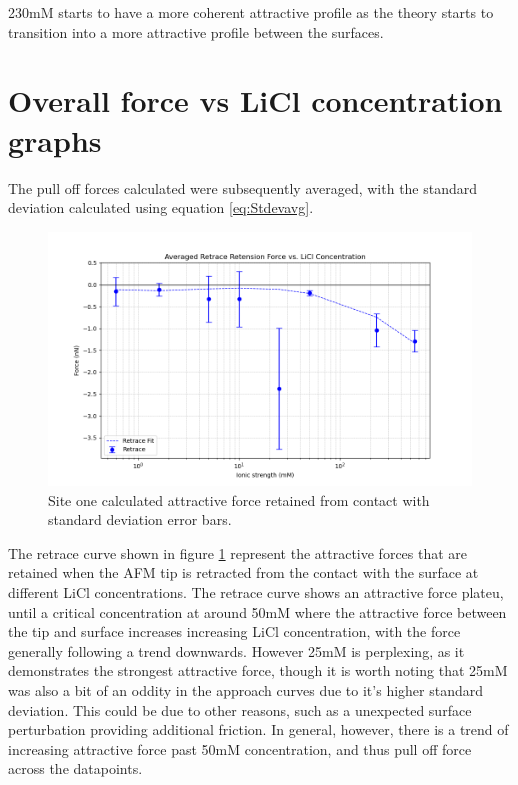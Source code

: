 
230mM starts to have a more coherent attractive profile as the theory starts to transition into a more attractive profile between the surfaces.


\section{Overall force vs LiCl concentration graphs}

The pull off forces calculated were subsequently averaged, with the standard deviation calculated using equation \ref{eq:Stdevavg}.

\begin{figure}
    \centering
    \includegraphics[width=1\linewidth]{chapter6/Averages.png}
    \caption{Site one calculated attractive force retained from contact with standard deviation error bars.}
    \label{fig:site1cont}
\end{figure}


The retrace curve shown in figure \ref{fig:site1cont} represent the attractive forces that are retained when the AFM tip is retracted from the contact with the surface at different LiCl concentrations. The retrace curve shows an attractive force plateu, until a critical concentration at around 50mM where the attractive force between the tip and surface increases increasing LiCl concentration, with the force generally following a trend downwards. However 25mM is perplexing, as it demonstrates the strongest attractive force, though it is worth noting that 25mM was also a bit of an oddity in the approach curves due to it's higher standard deviation. This could be due to other reasons, such as a unexpected surface perturbation providing additional friction. In general, however, there is a trend of increasing attractive force past 50mM concentration, and thus pull off force across the datapoints.

